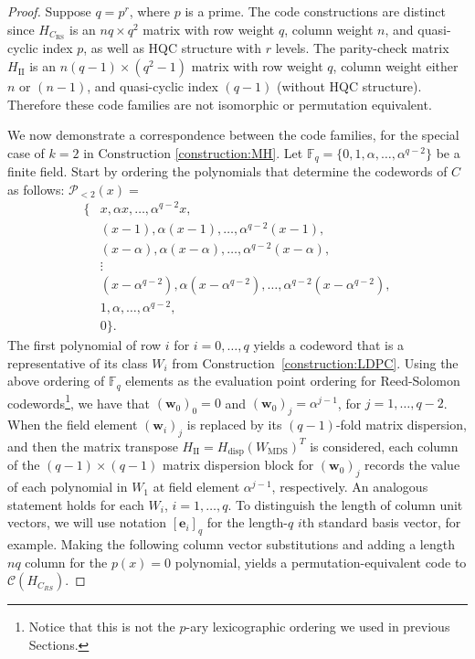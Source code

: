 \documentclass[11pt]{amsart}
\theoremstyle{definition}
\newcommand{\0}{\mathbf{0}}
\newcommand{\F}{\mathbb{F}}
\begin{document}
\begin{proof} Suppose $q=p^r$, where $p$ is a prime. The code constructions are  distinct since $H_{C_{\text{RS}}}$ is an $nq\times q^2$ matrix with row weight $q$, column weight $n$, and quasi-cyclic index $p$, as well as HQC structure with $r$ levels. The parity-check matrix $H_{\text{II}}$ is an $n(q-1)\times (q^2-1)$ matrix with row weight $q$, column weight either $n$ or $(n-1)$, and quasi-cyclic index $(q-1)$ (without HQC structure). Therefore these code families are not isomorphic or permutation equivalent.

We now demonstrate a correspondence between the code families, for the special case of $k=2$ in Construction \ref{construction:MH}. Let $\F_q=\{0, 1, \alpha, \ldots, \alpha^{q-2}\}$ be a finite field. Start by ordering the polynomials that determine the codewords of $C$ as follows: 
 $\mathcal{P}_{<2}(x)=$\begin{align*} \{&x,\alpha x, \ldots, \alpha^{q-2}x, \\ 
&(x-1), \alpha(x-1), \ldots, \alpha^{q-2}(x-1), \\
&(x-\alpha), \alpha(x-\alpha), \ldots, \alpha^{q-2}(x-\alpha), \\
&\vdots \\
&(x-\alpha^{q-2}), \alpha(x-\alpha^{q-2}), \ldots, \alpha^{q-2}(x-\alpha^{q-2}), \\
&1, \alpha, \ldots, \alpha^{q-2},\\
&0\}.\end{align*} 
The first polynomial of  row $i$ for $i=0, \ldots, q$ yields a codeword that is a representative of its class $W_i$ from Construction~\ref{construction:LDPC}. Using the above ordering of $\F_q$ elements as the evaluation point ordering for Reed-Solomon codewords\footnote{Notice that this is not the $p$-ary lexicographic ordering we used in previous Sections.}, we have that $(\textbf{w}_0)_0=0$ and $(\textbf{w}_0)_j=\alpha^{j-1}$, for $j=1, \ldots, q-2$. When the field element $(\textbf{w}_i)_j$ is replaced by its $(q-1)$-fold matrix dispersion, and then the matrix transpose $H_{\text{II}}=H_{\text{disp}}(W_{\text{MDS}})^T$ is considered, each column of the $(q-1)\times (q-1)$ matrix dispersion block for $(\textbf{w}_0)_j$ records the value of each polynomial in $W_1$ at field element $\alpha^{j-1}$, respectively. An analogous statement holds for each $W_i$, $i=1,\ldots, q$. To distinguish the length of column unit vectors, we will use notation $[\textbf{e}_i]_q$ for the length-$q$ $i$th standard basis vector, for example. Making the following column vector substitutions and adding a length $nq$ column for the $p(x)=0$ polynomial, yields a permutation-equivalent code to $\mathcal{C}(H_{C_{RS}})$. 

\end{proof}
\end{document}
